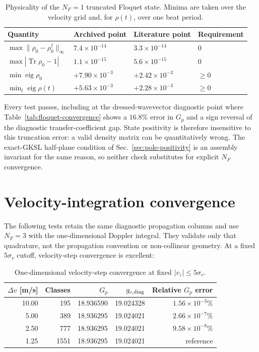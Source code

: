 \documentclass[11pt,a4paper]{article}
\newcommand{\Tr}{\operatorname{Tr}}
\begin{document}
\begin{table}[ht]
\centering
\caption{Physicality of the $N_F=1$ truncated Floquet state. Minima are taken
over the velocity grid and, for $\rho(t)$, over one beat period.}
\label{tab:physicality}
\small
\begin{tabularx}{\textwidth}{L{4.4cm}C{3.0cm}C{3.0cm}Y}
\toprule
Quantity & Archived point & Literature point & Requirement\\
\midrule
$\max\|\rho_0-\rho_0^\dagger\|_\infty$ &
$7.4\times10^{-14}$ & $3.3\times10^{-14}$ & $0$\\
$\max|\Tr\rho_0-1|$ &
$1.1\times10^{-15}$ & $5.6\times10^{-15}$ & $0$\\
$\min\operatorname{eig}\rho_0$ &
$+7.90\times10^{-3}$ & $+2.42\times10^{-3}$ & $\geq0$\\
$\min_t\operatorname{eig}\rho(t)$ &
$+5.63\times10^{-3}$ & $+2.28\times10^{-3}$ & $\geq0$\\
\bottomrule
\end{tabularx}
\end{table}

Every test passes, including at the dressed-wavevector diagnostic point where
Table~\ref{tab:floquet-convergence} shows a $16.8\%$ error in $G_p$ and a sign
reversal of the diagnostic transfer-coefficient gap. State positivity is
therefore insensitive to this truncation error: a valid density matrix can be
quantitatively wrong. The exact-GKSL half-plane condition of
Sec.~\ref{sec:pole-positivity} is an assembly invariant for the same reason,
so neither check substitutes for explicit $N_F$ convergence.

\clearpage
\section{Velocity-integration convergence}

The following tests retain the same diagnostic propagation columns and use
$N_F=3$ with the one-dimensional Doppler integral. They validate only that
quadrature, not the propagation convention or non-collinear geometry.
At a fixed $5\sigma_v$ cutoff, velocity-step convergence is excellent:

\begin{table}[ht]
\centering
\caption{One-dimensional velocity-step convergence at fixed
$|v_z|\leq5\sigma_v$.}
\label{tab:velocity-step}
\small
\begin{tabular}{r r r r r}
\toprule
$\Delta v$ [m/s] & Classes & $G_p$ & $g_{c,{\rm diag}}$ &
Relative $G_p$ error\\
\midrule
10.00 & 195 & 18.936590 & 19.024328 & $1.56\times10^{-3}\%$\\
5.00  & 389 & 18.936295 & 19.024021 & $2.66\times10^{-7}\%$\\
2.50  & 777 & 18.936295 & 19.024021 & $9.58\times10^{-8}\%$\\
1.25  & 1551 & 18.936295 & 19.024021 & reference\\
\bottomrule
\end{tabular}
\end{table}
\end{document}
